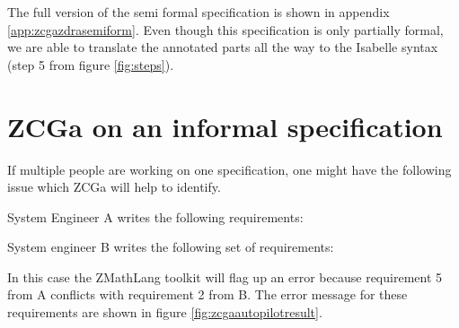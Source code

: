 The full version of the semi formal specification is shown in appendix
\ref{app:zcgazdrasemiform}. Even though this specification is only partially
formal, we are able to translate the annotated parts all the way to the Isabelle
syntax (step 5 from figure \ref{fig:steps}).

\section{ZCGa on an informal specification}

If multiple people are working on one specification, one might have the
following issue which ZCGa will help to identify.

System Engineer A writes the following requirements:

 \noindent{}

 System engineer B writes the following set of requirements:


 \noindent{}


 In this case the ZMathLang toolkit will flag up an error because requirement 5
 from A conflicts with requirement 2 from B.  The error message for these
 requirements are shown in figure \ref{fig:zcgaautopilotresult}.

